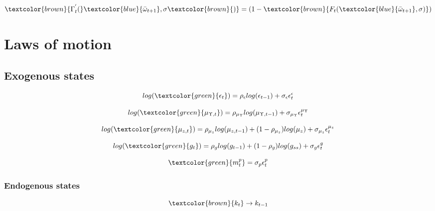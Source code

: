 \begin{equation*}
\textcolor{brown}{\Gamma_t^{'}(}\textcolor{blue}{\bar{\omega}_{t+1}},\sigma\textcolor{brown}{)}
 = \left(1- \textcolor{brown}{F_{t}(\textcolor{blue}{\bar{\omega}_{t+1}}, \sigma)} \right) 
\end{equation*}





\section{Laws of motion}
\subsection{Exogenous states}

\begin{equation*}
	log(\textcolor{green}{\epsilon_{t}}) =  \rho_{\epsilon} log(\epsilon_{t-1})
											 + \sigma_{\epsilon}\epsilon_t^{\epsilon}
\end{equation*}

\begin{equation*}
	log(\textcolor{green}{\mu_{\Upsilon,t}}) =  \rho_{\mu_{\Upsilon}} log(\mu_{\Upsilon,t-1})
											 + \sigma_{\mu_{\Upsilon}} \epsilon_t^{\mu_{\Upsilon}}
\end{equation*}

\begin{equation*}
	log(\textcolor{green}{\mu_{z,t}}) =  \rho_{\mu_{z}} log(\mu_{z,t-1})
										+ (1-\rho_{\mu_{z}}) log(\mu_{z})
											 + \sigma_{\mu_{z}}\epsilon_t^{\mu_{z}}
\end{equation*}

\begin{equation*}
	log(\textcolor{green}{g_{t}}) =  \rho_{g} log(g_{t-1})
										+ (1-\rho_{g}) log(g_{ss})
											 + \sigma_{g}\epsilon_t^{g}
\end{equation*}

\begin{equation*}
	\textcolor{green}{m_{t}^p} = \sigma_{p}\epsilon_t^{p}
\end{equation*}


\subsubsection{Endogenous states}
\begin{equation*}
    \textcolor{brown}{k_t} \rightarrow k_{t-1}
\end{equation*}

